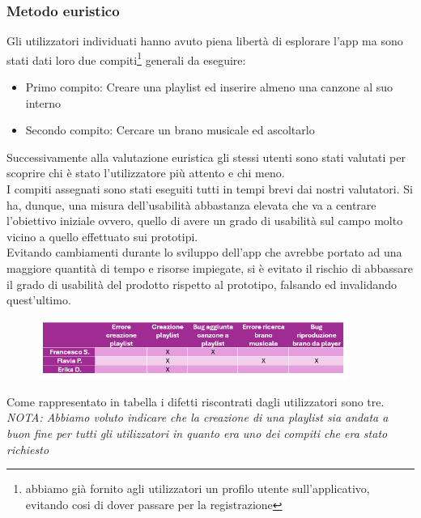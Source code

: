 \documentclass{article}
\begin{document}
		\subsubsection{Metodo euristico}
		Gli utilizzatori individuati hanno avuto piena libertà di esplorare l'app ma sono stati dati loro due compiti\footnote{abbiamo già fornito agli utilizzatori un profilo utente sull'applicativo, evitando cosi di dover passare per la registrazione} generali da eseguire:
		\begin{itemize}
			\item Primo compito: Creare una playlist ed inserire almeno una canzone al suo interno
			\item Secondo compito: Cercare un brano musicale ed ascoltarlo
		\end{itemize}
		Successivamente alla valutazione euristica gli stessi utenti sono stati valutati per scoprire chi è stato l’utilizzatore più attento e chi meno.\\
		I compiti assegnati sono stati eseguiti tutti in tempi brevi dai nostri valutatori. Si ha, dunque, una misura dell'usabilità abbastanza elevata che va a centrare l'obiettivo iniziale ovvero, quello di avere un grado di usabilità sul campo molto vicino a quello effettuato sui prototipi.\\
		Evitando cambiamenti durante lo sviluppo dell'app che avrebbe portato ad una maggiore quantità di tempo e risorse impiegate, si è evitato il rischio di abbassare il grado di usabilità del prodotto rispetto al prototipo, falsando ed invalidando quest'ultimo.
		\begin{figure}[H]
			\centering
			\includegraphics[width=0.9\textwidth]{Immagini/tabella}
		\end{figure}
		Come rappresentato in tabella i difetti riscontrati dagli utilizzatori sono tre.\\
		\textit{NOTA: Abbiamo voluto indicare che la creazione di una playlist sia andata a buon fine per tutti gli utilizzatori in quanto era uno dei compiti che era stato richiesto}
		
\end{document}
